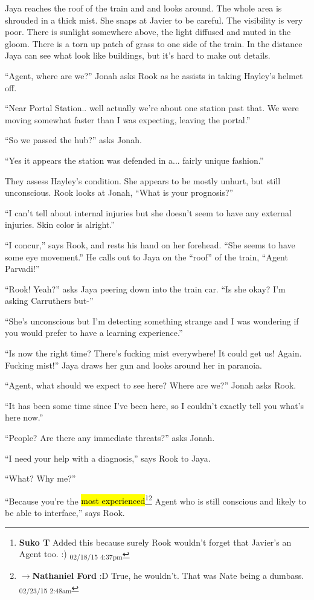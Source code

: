 Jaya reaches the roof of the train and and looks around.  The whole area is shrouded in a thick mist.  She snaps at Javier to be careful.  The visibility is very poor.  There is sunlight somewhere above, the light diffused and muted in the gloom.  There is a torn up patch of grass to one side of the train.  In the distance Jaya can see what look like buildings, but it's hard to make out details.



``Agent, where are we?'' Jonah asks Rook as he assists in taking Hayley's helmet off.

``Near Portal Station.. well actually we're about one station past that.  We were moving somewhat faster than I was expecting, leaving the portal.''

``So we passed the hub?'' asks Jonah.

``Yes it appears the station was defended in a... fairly unique fashion.''

They assess Hayley's condition.  She appears to be mostly unhurt, but still unconscious.  Rook looks at Jonah, ``What is your prognosis?''

``I can't tell about internal injuries but she doesn't seem to have any external injuries.  Skin color is alright.''

``I concur,'' says Rook, and rests his hand on her forehead.  ``She seems to have some eye movement.''  He calls out to Jaya on the ``roof'' of the train, ``Agent Parvadi!''

``Rook!  Yeah?'' asks Jaya peering down into the train car.  ``Is she okay?  I'm asking Carruthers but-''

``She's unconscious but I'm detecting something strange and I was wondering if you would prefer to have a learning experience.''

``Is now the right time? There's fucking mist everywhere!  It could get us!  Again.  Fucking mist!''  Jaya draws her gun and looks around her in paranoia.

``Agent, what should we expect to see here?  Where are we?'' Jonah asks Rook.

``It has been some time since I've been here, so I couldn't exactly tell you what's here now.''

``People?  Are there any immediate threats?'' asks Jonah.

``I need your help with a diagnosis,'' says Rook to Jaya.

``What?  Why me?''

``Because you're the \hl{most experienced}\footnote{\textbf{Suko T }Added this because surely Rook wouldn't forget that Javier's an Agent too. :) \textsubscript{02/18/15 4:37pm}}\footnote{$\rightarrow$\textbf{Nathaniel Ford }:D True, he wouldn't. That was Nate being a dumbass. \textsubscript{02/23/15 2:48am}} Agent who is still conscious and likely to be able to interface,'' says Rook. 

